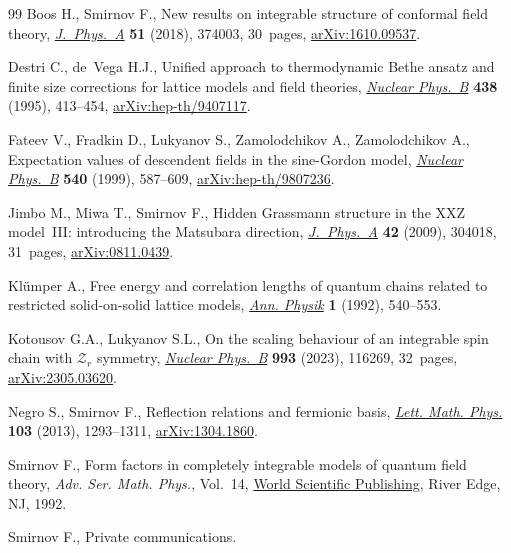 \documentclass[pdftex]{sigma}
\numberwithin{equation}{section}
\begin{document}
\begin{thebibliography}{99}
Boos H., Smirnov F., New results on integrable structure of conformal field
  theory, \href{https://doi.org/10.1088/1751-8121/aad4bb}{\textit{J.~Phys.~A}} \textbf{51} (2018), 374003, 30~pages,
  \href{https://arxiv.org/abs/1610.09537}{arXiv:1610.09537}.

Destri C., de~Vega H.J., Unified approach to thermodynamic {B}ethe ansatz and
  finite size corrections for lattice models and field theories,
  \href{https://doi.org/10.1016/0550-3213(94)00547-R}{\textit{Nuclear Phys.~B}} \textbf{438} (1995), 413--454,
  \href{https://arxiv.org/abs/hep-th/9407117}{arXiv:hep-th/9407117}.

Fateev V., Fradkin D., Lukyanov S., Zamolodchikov A., Zamolodchikov A.,
  Expectation values of descendent fields in the sine-{G}ordon model,
  \href{https://doi.org/10.1016/S0550-3213(98)00724-X}{\textit{Nuclear Phys.~B}} \textbf{540} (1999), 587--609,
  \href{https://arxiv.org/abs/hep-th/9807236}{arXiv:hep-th/9807236}.

Jimbo M., Miwa T., Smirnov F., Hidden {G}rassmann structure in the {XXZ}
  model~{III}: introducing the {M}atsubara direction, \href{https://doi.org/10.1088/1751-8113/42/30/304018}{\textit{J.~Phys.~A}}
  \textbf{42} (2009), 304018, 31~pages, \href{https://arxiv.org/abs/0811.0439}{arXiv:0811.0439}.

Kl\"umper A., Free energy and correlation lengths of quantum chains related to
  restricted solid-on-solid lattice models, \href{https://doi.org/10.1002/andp.19925040707}{\textit{Ann. Physik}} \textbf{1}
  (1992), 540--553.

Kotousov G.A., Lukyanov S.L., On the scaling behaviour of an integrable spin
  chain with {$\mathcal{Z}_r$} symmetry, \href{https://doi.org/10.1016/j.nuclphysb.2023.116269}{\textit{Nuclear Phys.~B}} \textbf{993}
  (2023), 116269, 32~pages, \href{https://arxiv.org/abs/2305.03620}{arXiv:2305.03620}.

Negro S., Smirnov F., Reflection relations and fermionic basis, \href{https://doi.org/10.1007/s11005-013-0640-7}{\textit{Lett.
  Math. Phys.}} \textbf{103} (2013), 1293--1311, \href{https://arxiv.org/abs/1304.1860}{arXiv:1304.1860}.

Smirnov F., Form factors in completely integrable models of quantum field
  theory, \textit{Adv. Ser. Math. Phys.}, Vol.~14, \href{https://doi.org/10.1142/1115}{World Scientific Publishing},
  River Edge, NJ, 1992.

Smirnov F., {P}rivate communications.

\end{thebibliography}\LastPageEnding
\end{document}
